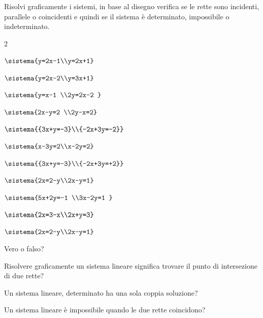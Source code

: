 \begin{esercizio}[*]
 \label{ese:22.39}
Risolvi graficamente i sistemi, in base al disegno verifica se le rette
sono incidenti, parallele o coincidenti e quindi se il sistema è
determinato, impossibile o indeterminato.
\begin{htmulticols}{2}
\begin{enumeratea}
\item \(\sistema{y=2x-1\\y=2x+1}\)
\item \(\sistema{y=2x-2\\y=3x+1}\)
\item \(\sistema{y=x-1 \\2y=2x-2 }\)
\item \(\sistema{2x-y=2 \\2y-x=2}\)
\item \(\sistema{{3x+y=-3}\\{-2x+3y=-2}}\)
\item \(\sistema{x-3y=2\\x-2y=2}\)
\item \(\sistema{{3x+y=-3}\\{-2x+3y=+2}}\)
\item \(\sistema{2x=2-y\\2x-y=1}\)
\item \(\sistema{5x+2y=-1 \\3x-2y=1 }\)
\item \(\sistema{2x=3-x\\2x+y=3}\)
\item \(\sistema{2x=2-y\\2x-y=1}\)
\end{enumeratea}
\end{htmulticols}
\end{esercizio}

\begin{esercizio}
 \label{ese:22.42}
Vero o falso?
 \begin{enumeratea}
\item Risolvere graficamente un sistema lineare significa trovare il punto 
di intersezione di due rette? 
\hfill\verofalso
\item Un sistema lineare, determinato ha una sola coppia soluzione?
\hfill\verofalso
\item Un sistema lineare è impossibile quando le due rette coincidono?
\hfill\verofalso
\end{enumeratea}
\end{esercizio}

